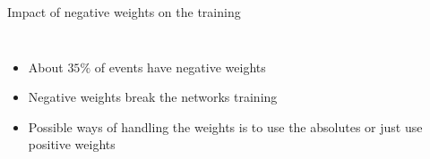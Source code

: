 \begin{frame}{Impact of negative weights on the training}
\begin{columns}
\begin{column}{0.5\textwidth}
\begin{figure}
            \end{figure}
        \end{column}
    \end{columns}
    \begin{itemize}
        \item About $35 \%$ of events have negative weights
        \item Negative weights break the networks training
        \item Possible ways of handling the weights is to use the absolutes or just use positive weights
    \end{itemize}
\end{frame}